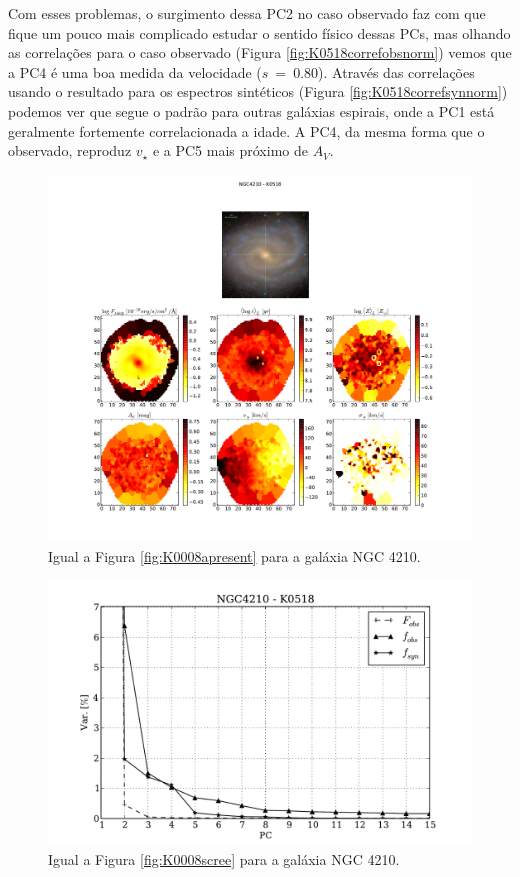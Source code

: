 Com esses problemas, o surgimento dessa PC2 no caso observado faz com que fique um pouco mais complicado estudar o
sentido físico dessas PCs, mas olhando as correlações para o caso observado (Figura \ref{fig:K0518correfobsnorm}) vemos
que a PC4 é uma boa medida da velocidade ($s\ =\ 0.80$). Através das correlações usando o resultado para os espectros
sintéticos (Figura \ref{fig:K0518correfsynnorm}) podemos ver que segue o padrão para outras galáxias espirais, onde a
PC1 está geralmente fortemente correlacionada a idade. A PC4, da mesma forma que o observado, reproduz $v_\star$ e a PC5
mais próximo de $A_V$.

\begin{figure}
    \includegraphics[width=1.\textwidth]{figuras/K0518-apresent.pdf}
    \caption[Propriedades f\'isicas da gal\'axia NGC 4210.]
    {Igual a Figura \ref{fig:K0008apresent} para a galáxia NGC 4210.}
    \label{fig:K0518apresent}
\end{figure}

\begin{figure}
    \includegraphics[height=0.33\textheight]{figuras/K0518-screetest.pdf}
    \caption[Scree test comparativo entre 3 PCAs - NGC 4210.]
	{Igual a Figura \ref{fig:K0008scree} para a galáxia NGC 4210.}
    \label{fig:K0518scree}
\end{figure}

